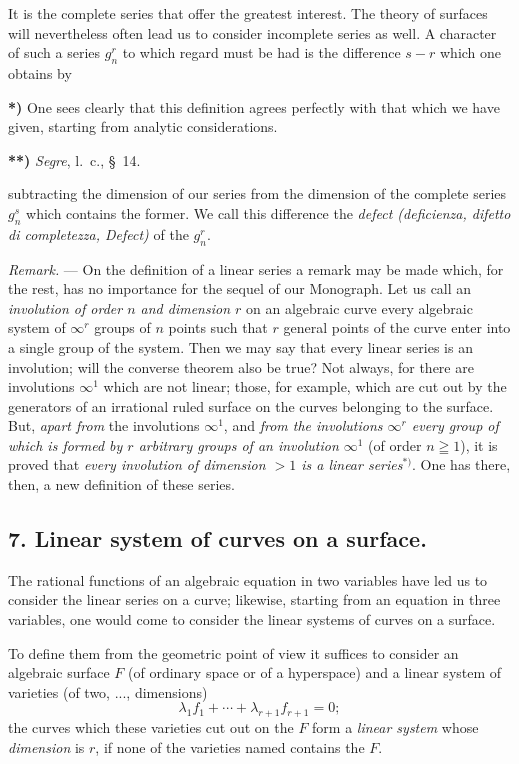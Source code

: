 \documentclass{article}
\begin{document}
It is the complete series that offer the greatest interest. The theory of surfaces will nevertheless often lead us to consider incomplete series as well. A character of such a series $g_{n}^{r}$ to which regard must be had is the difference $s - r$ which one obtains by

\textbf{*)} One sees clearly that this definition agrees perfectly with that which we have given, starting from analytic considerations.

\textbf{**)} \emph{Segre}, l.\ c., §~14.

subtracting the dimension of our series from the dimension of the complete series $g_{n}^{s}$ which contains the former. We call this difference the \emph{defect (deficienza, difetto di completezza, Defect)} of the $g_{n}^{r}$.

\emph{Remark.} --- On the definition of a linear series a remark may be made which, for the rest, has no importance for the sequel of our Monograph. Let us call an \emph{involution of order $n$ and dimension $r$} on an algebraic curve every algebraic system of $\infty^{r}$ groups of $n$ points such that $r$ general points of the curve enter into a single group of the system. Then we may say that every linear series is an involution; will the converse theorem also be true? Not always, for there are involutions $\infty^{1}$ which are not linear; those, for example, which are cut out by the generators of an irrational ruled surface on the curves belonging to the surface. But, \emph{apart from} the involutions $\infty^{1}$, and \emph{from the involutions $\infty^{r}$ every group of which is formed by $r$ arbitrary groups of an involution $\infty^{1}$} (of order $n \geqq 1$), it is proved that \emph{every involution of dimension $> 1$ is a linear series}${}^{*)}$. One has there, then, a new definition of these series.

\subsection*{7. Linear system of curves on a surface.}

The rational functions of an algebraic equation in two variables have led us to consider the linear series on a curve; likewise, starting from an equation in three variables, one would come to consider the linear systems of curves on a surface.

To define them from the geometric point of view it suffices to consider an algebraic surface $F$ (of ordinary space or of a hyperspace) and a linear system of varieties (of two, ..., dimensions)
\[
\lambda_{1}f_{1} + \cdots + \lambda_{r+1}f_{r+1} = 0;
\]
the curves which these varieties cut out on the $F$ form a \emph{linear system} whose \emph{dimension} is $r$, if none of the varieties named contains the $F$.
\end{document}
